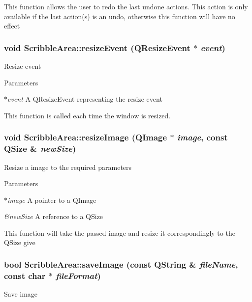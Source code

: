 This function allows the user to redo the last undone actions. This action is only available if the last action(s) is an undo, otherwise this function will have no effect \hypertarget{classScribbleArea_aaf6be24625a5f0fe1e4a3b8eecb07575}{
\subsubsection[{resizeEvent}]{\setlength{\rightskip}{0pt plus 5cm}void ScribbleArea::resizeEvent (QResizeEvent $\ast$ {\em event})}}
\label{classScribbleArea_aaf6be24625a5f0fe1e4a3b8eecb07575}
Resize event


\begin{DoxyParams}{Parameters}
\item[{\em $\ast$event}]A QResizeEvent representing the resize event\end{DoxyParams}
This function is called each time the window is resized. \hypertarget{classScribbleArea_af968a1bb4a81acf6a2462fd3ecb7c725}{
\subsubsection[{resizeImage}]{\setlength{\rightskip}{0pt plus 5cm}void ScribbleArea::resizeImage (QImage $\ast$ {\em image}, \/  const QSize \& {\em newSize})}}
\label{classScribbleArea_af968a1bb4a81acf6a2462fd3ecb7c725}
Resize a image to the required parameters


\begin{DoxyParams}{Parameters}
\item[{\em $\ast$image}]A pointer to a QImage \item[{\em \&newSize}]A reference to a QSize\end{DoxyParams}
This function will take the passed image and resize it correspondingly to the QSize give \hypertarget{classScribbleArea_a9496b9970942db6abfea836e6bf56ee4}{
\subsubsection[{saveImage}]{\setlength{\rightskip}{0pt plus 5cm}bool ScribbleArea::saveImage (const QString \& {\em fileName}, \/  const char $\ast$ {\em fileFormat})}}
\label{classScribbleArea_a9496b9970942db6abfea836e6bf56ee4}
Save image


